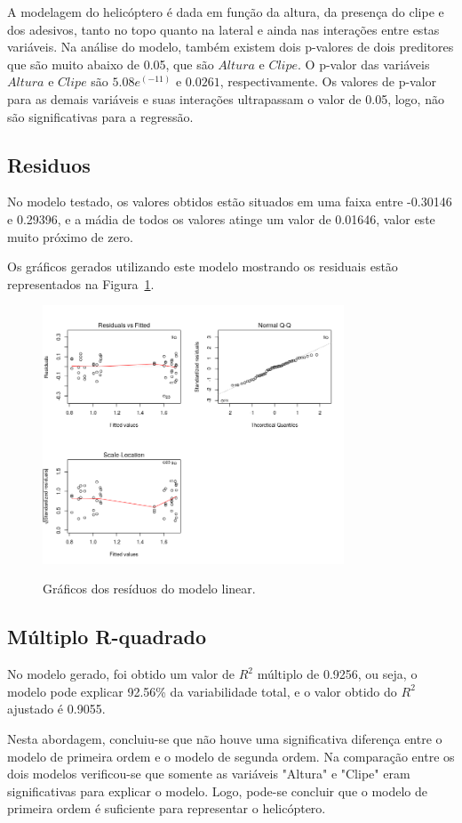 A modelagem do helicóptero é dada em função da altura, da presença do clipe e dos adesivos, tanto no topo quanto na lateral e ainda nas interações entre estas variáveis. Na análise do modelo, também existem dois p-valores de dois preditores que são muito abaixo de 0.05, que são $Altura$ e $Clipe$. O p-valor das variáveis $Altura$ e $Clipe$ são $5.08e^(-11)$ e $0.0261$, respectivamente. Os valores de p-valor para as demais variáveis e suas interações ultrapassam o valor de 0.05, logo, não são significativas para a regressão.

\subsection{Residuos}

No modelo testado, os valores obtidos estão situados em uma faixa entre -0.30146 e 0.29396, e a mádia de todos os valores atinge um valor de 0.01646, valor este muito próximo de zero.

Os gráficos gerados utilizando este modelo mostrando os residuais estão representados na Figura~\ref{fig:residuos-plot2}.

\begin{figure}[H]
    \centering
    \caption{Gráficos dos resíduos do modelo linear.}
    \includegraphics[width=0.8\textwidth]{images/model2ordem.png}
    \label{fig:residuos-plot2}
  \end{figure}


  \subsection{Múltiplo R-quadrado}

No modelo gerado, foi obtido um valor de $R^2$ múltiplo de 0.9256, ou seja, o modelo pode explicar 92.56\% da variabilidade total, e o valor obtido do $R^2$ ajustado é 0.9055. 

Nesta abordagem, concluiu-se que não houve uma significativa diferença entre o modelo de primeira ordem e o modelo de segunda ordem. Na comparação entre os dois modelos verificou-se que somente as variáveis "Altura" e "Clipe" eram significativas para explicar o modelo. Logo, pode-se concluir que o modelo de primeira ordem é suficiente para representar o helicóptero.